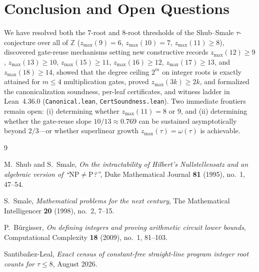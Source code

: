 \documentclass[11pt]{article}
\newcommand{\Z}{\mathbb{Z}}
\newcommand{\code}[1]{\texttt{#1}}
\newcommand{\zmax}{z_{\max}}
\begin{document}
\section{Conclusion and Open Questions}
We have resolved both the $7$-root and $8$-root thresholds of the Shub--Smale $\tau$-conjecture over all of $\Z$ ($\zmax(9) = 6$, $\zmax(10) = 7$, $\zmax(11) \ge 8$), discovered gate-reuse mechanisms setting new constructive records $\zmax(12) \ge 9$, $\zmax(13) \ge 10$, $\zmax(15) \ge 11$, $\zmax(16) \ge 12$, $\zmax(17) \ge 13$, and $\zmax(18) \ge 14$, showed that the degree ceiling $2^m$ on integer roots is exactly attained for $m \le 4$ multiplication gates, proved $\zmax(3k) \ge 2k$, and formalized the canonicalization soundness, per-leaf certificates, and witness ladder in Lean~4.36.0 (\code{Canonical.lean}, \code{CertSoundness.lean}). Two immediate frontiers remain open: (i) determining whether $\zmax(11) = 8$ or $9$, and (ii) determining whether the gate-reuse slope $10/13 \approx 0.769$ can be sustained asymptotically beyond $2/3$---or whether superlinear growth $\zmax(\tau) = \omega(\tau)$ is achievable.

\begin{thebibliography}{9}

M.~Shub and S.~Smale,
\emph{On the intractability of Hilbert's Nullstellensatz and an algebraic version of ``$\mathrm{NP} \neq \mathrm{P}$?''},
Duke Mathematical Journal \textbf{81} (1995), no.~1, 47--54.

S.~Smale,
\emph{Mathematical problems for the next century},
The Mathematical Intelligencer \textbf{20} (1998), no.~2, 7--15.

P.~B\"urgisser,
\emph{On defining integers and proving arithmetic circuit lower bounds},
Computational Complexity \textbf{18} (2009), no.~1, 81--103.

Santiba\~{n}ez-Leal,
\emph{Exact census of constant-free straight-line program integer root counts for $\tau \le 8$},
August 2026.

\end{thebibliography}
\end{document}

